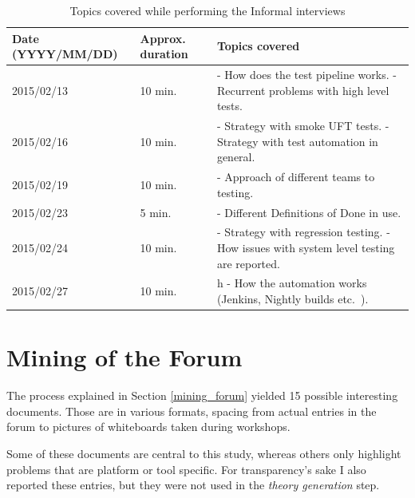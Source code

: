 		\begin{table}[htb]
			\centering
			\caption{Topics covered while performing the Informal interviews}
			\label{tab:informal_interviews_topics}
			\begin{tabulary}{\columnwidth}{|L|L|L|}
				\hline
				
				\textbf{Date} {\tiny (YYYY/MM/DD)} & \textbf{Approx. duration} & \textbf{Topics covered} \\
				\hline
				
				2015/02/13 &
				10 min. &
				- How does the test pipeline works.\newline
				- Recurrent problems with high level tests. \\
				\hline
				
				2015/02/16 &
				10 min. &
				- Strategy with smoke UFT tests. \newline
				- Strategy with test automation in general. \\
				\hline
				
				2015/02/19 &
				10 min. &
				- Approach of different teams to testing. \\
				\hline
				
				2015/02/23 &
				5 min. &
				- Different Definitions of Done in use. \\
				\hline
				
				2015/02/24 &
				10 min. &
				- Strategy with regression testing. \newline
				- How issues with system level testing are reported. \\
				\hline
				
				2015/02/27 &
				10 min. &h
				- How the automation works (Jenkins, Nightly builds etc.\ ). \\
				\hline
				
				
                
			\end{tabulary}		
		\end{table}


\section{Mining of the Forum}
The process explained in Section \ref{mining_forum} yielded 15 possible interesting documents. Those are in various formats, spacing from actual entries in the forum to pictures of whiteboards taken during workshops.

Some of these documents are central to this study, whereas others only highlight problems that are platform or tool specific. For transparency's sake I also reported these entries, but they were not used in the \textit{theory generation} step.

